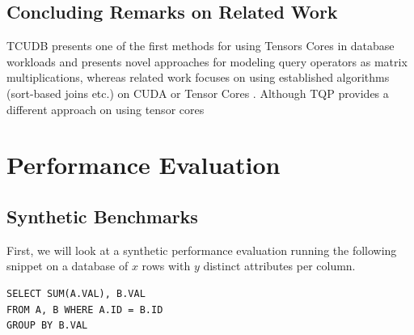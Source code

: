 \documentclass{paper}
\begin{document}
	\subsection{Concluding Remarks on Related Work}
	
	TCUDB presents one of the first methods for using Tensors Cores in database workloads and presents novel approaches for modeling query operators as matrix multiplications, whereas related work focuses on using established algorithms (sort-based joins etc.) on CUDA \cite{yuan2013yin} or Tensor Cores \cite{he2022query}. Although TQP provides a different approach on using tensor cores 
	
	\section{Performance Evaluation} \label{sec:perf_eval}
	

	\subsection{Synthetic Benchmarks}
	
	First, we will look at a synthetic performance evaluation running the following snippet on a database of $x$ rows with $y$ distinct attributes per column.
	\begin{verbatim}
SELECT SUM(A.VAL), B.VAL
FROM A, B WHERE A.ID = B.ID
GROUP BY B.VAL
	\end{verbatim}
\end{document}

